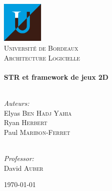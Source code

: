\begin{titlepage}
\begin{center}

\includegraphics[width=0.15\textwidth]{./resources/ub.png}~\\[1cm]

\textsc{\LARGE Université de Bordeaux}\\[1.5cm]

\textsc{\Large {Architecture Logicielle}}\\[0.5cm]

\HRule \\[0.5cm]
{ \huge \bfseries STR et framework de jeux 2D}\\[0.2cm]
\HRule \\[1.5cm]

\begin{minipage}{0.4\textwidth}
\begin{flushleft} \large
\emph{Auteurs:} \\
Elyas \textsc{Ben Hadj Yahia}\\
Ryan \textsc{Herbert}\\
Paul \textsc{Maribon-Ferret}\\
\end{flushleft}
\end{minipage}
\begin{minipage}{0.4\textwidth}
\begin{flushright} \large
\emph{\\Professor:} \\
David \textsc{Auber}
\end{flushright}
\end{minipage}

\vfill

{\large \today}

\end{center}
\end{titlepage}
